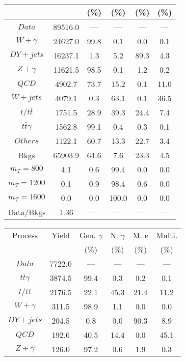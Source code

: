 \begin{figure}
\begin{minipage}[c]{0.32\textwidth}
{\begin{tabular}{cccccc}
 &  & (\%) & (\%) & (\%) & (\%)  \\
\hline
                                                                      $ Data $ &  89516.0 &  --- &  --- &  --- &  ---\\
$ W+\gamma $ &  24627.0 &  99.8 &  0.1 &  0.0 &  0.1\\
$ DY+jets $ &  16237.1 &  1.3 &  5.2 &  89.3 &  4.3\\
$ Z+\gamma $ &  11621.5 &  98.5 &  0.1 &  1.2 &  0.2\\
$ QCD $ &  4902.7 &  73.7 &  15.2 &  0.1 &  11.0\\
$ W+jets $ &  4079.1 &  0.3 &  63.1 &  0.1 &  36.5\\
$ t/t\bar{t} $ &  1751.5 &  28.9 &  39.3 &  24.4 &  7.4\\
$ t\bar{t}\gamma $ &  1562.8 &  99.1 &  0.4 &  0.3 &  0.1\\
$ Others $ &  1122.1 &  60.7 &  13.3 &  22.7 &  3.4\\
Bkgs &  65903.9 &  64.6 &  7.6 &  23.3 &  4.5\\
$ m_{T} = 800 $ &  4.1 &  0.6 &  99.4 &  0.0 &  0.0\\
$ m_{T} = 1200 $ &  0.1 &  0.9 &  98.4 &  0.6 &  0.0\\
$ m_{T} = 1600 $ &  0.0 &  0.0 &  100.0 &  0.0 &  0.0\\
Data/Bkgs &  1.36 &  --- &  --- &  --- &  ---\\
\hline
\end{tabular}
}
\end{minipage}
\begin{minipage}[c]{0.32\textwidth}
\centering
\tiny{
\begin{tabular}{cccccc}
\hline
Process & Yield & Gen. $\gamma$ & N. $\gamma$ & M. e & Multi. \\
 &  & (\%) & (\%) & (\%) & (\%)  \\
\hline
                                                                      $ Data $ &  7722.0 &  --- &  --- &  --- &  ---\\
$ t\bar{t}\gamma $ &  3874.5 &  99.4 &  0.3 &  0.2 &  0.1\\
$ t/t\bar{t} $ &  2176.5 &  22.1 &  45.3 &  21.4 &  11.2\\
$ W+\gamma $ &  311.5 &  98.9 &  1.1 &  0.0 &  0.0\\
$ DY+jets $ &  204.5 &  0.8 &  0.0 &  90.3 &  8.9\\
$ QCD $ &  192.6 &  40.5 &  14.4 &  0.0 &  45.1\\
$ Z+\gamma $ &  126.0 &  97.2 &  0.6 &  1.9 &  0.3\\

\end{tabular}}
\end{minipage}
\end{figure}
